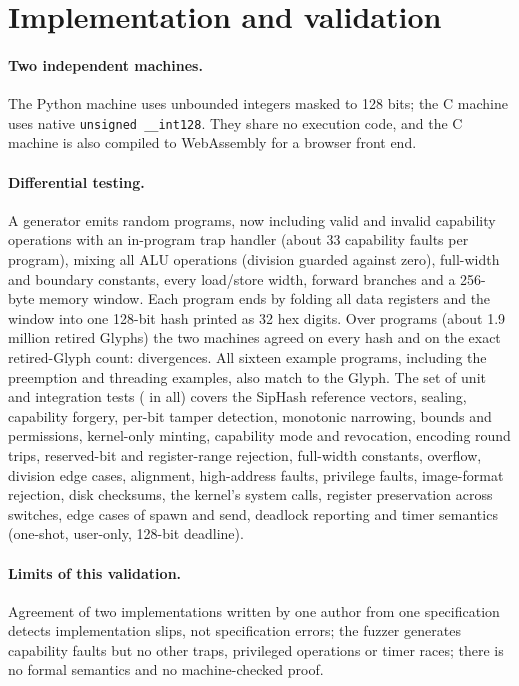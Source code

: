 \documentclass[10pt,a4paper]{article}
\begin{document}
\section{Implementation and validation}
\paragraph{Two independent machines.} The Python machine uses unbounded integers masked to 128 bits; the C machine uses native \texttt{unsigned \_\_int128}. They share no execution code, and the C machine is also compiled to WebAssembly for a browser front end.
\paragraph{Differential testing.} A generator emits random programs, now including valid and invalid capability operations with an in-program trap handler (about 33 capability faults per program), mixing all ALU operations (division guarded against zero), full-width and boundary constants, every load/store width, forward branches and a 256-byte memory window. Each program ends by folding all data registers and the window into one 128-bit hash printed as 32 hex digits. Over \FuzzPrograms{} programs (about 1.9 million retired Glyphs) the two machines agreed on every hash and on the exact retired-Glyph count: \FuzzDivergences{} divergences. All sixteen example programs, including the preemption and threading examples, also match to the Glyph. The set of unit and integration tests (\UnitTests{} in all) covers the SipHash reference vectors, sealing, capability forgery, per-bit tamper detection, monotonic narrowing, bounds and permissions, kernel-only minting, capability mode and revocation, encoding round trips, reserved-bit and register-range rejection, full-width constants, overflow, division edge cases, alignment, high-address faults, privilege faults, image-format rejection, disk checksums, the kernel's system calls, register preservation across switches, edge cases of spawn and send, deadlock reporting and timer semantics (one-shot, user-only, 128-bit deadline).
\paragraph{Limits of this validation.} Agreement of two implementations written by one author from one specification detects implementation slips, not specification errors; the fuzzer generates capability faults but no other traps, privileged operations or timer races; there is no formal semantics and no machine-checked proof.
\end{document}
